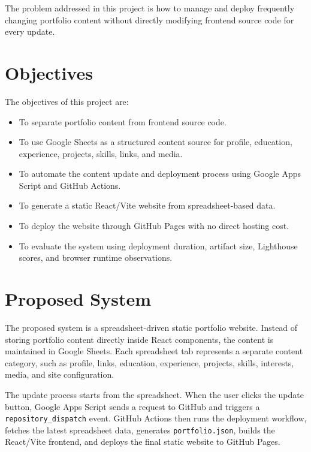 \documentclass[10pt,a4paper,twocolumn]{article}
\begin{document}
The problem addressed in this project is how to manage and deploy frequently changing portfolio content without directly modifying frontend source code for every update.

\section{Objectives}

The objectives of this project are:

\begin{itemize}
\item To separate portfolio content from frontend source code.
\item To use Google Sheets as a structured content source for profile, education, experience, projects, skills, links, and media.
\item To automate the content update and deployment process using Google Apps Script and GitHub Actions.
\item To generate a static React/Vite website from spreadsheet-based data.
\item To deploy the website through GitHub Pages with no direct hosting cost.
\item To evaluate the system using deployment duration, artifact size, Lighthouse scores, and browser runtime observations.
\end{itemize}

\section{Proposed System}

The proposed system is a spreadsheet-driven static portfolio website. Instead of storing portfolio content directly inside React components, the content is maintained in Google Sheets. Each spreadsheet tab represents a separate content category, such as profile, links, education, experience, projects, skills, interests, media, and site configuration.

The update process starts from the spreadsheet. When the user clicks the update button, Google Apps Script sends a request to GitHub and triggers a \texttt{repository\_dispatch} event. GitHub Actions then runs the deployment workflow, fetches the latest spreadsheet data, generates \texttt{portfolio.json}, builds the React/Vite frontend, and deploys the final static website to GitHub Pages.
\end{document}
